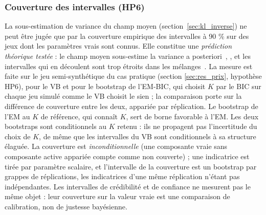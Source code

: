 \subsubsection*{Couverture des intervalles (HP6)}\label{sec:couverture}
La sous-estimation de variance du champ moyen (section~\ref{sec:kl_inverse}) ne peut être jugée que par la couverture empirique des intervalles à 90 \% sur des jeux dont les paramètres vrais sont connus. Elle constitue une \emph{prédiction théorique testée} : le champ moyen sous-estime la variance a posteriori~\cite[section~10.1.2]{bishop2006}, \cite{blei2017}, et les intervalles qui en découlent sont trop étroits dans les mélanges~\cite{wang2005}. La mesure est faite sur le jeu semi-synthétique du cas pratique (section \ref{sec:res_prix}, hypothèse HP6), pour le VB et pour le bootstrap de l'EM-BIC, qui choisit $K$ par le BIC sur chaque jeu simulé comme le VB choisit le sien ; la comparaison porte sur la différence de couverture entre les deux, appariée par réplication. Le bootstrap de l'EM au $K$ de référence, qui connaît $K$, sert de borne favorable à l'EM. Les deux bootstraps sont conditionnels au $K$ retenu : ils ne propagent pas l'incertitude du choix de $K$, de même que les intervalles du VB sont conditionnels à sa structure élaguée. La couverture est \emph{inconditionnelle} (une composante vraie sans composante active appariée compte comme non couverte) ; une indicatrice est tirée par paramètre scalaire, et l'intervalle de la couverture est un bootstrap par grappes de réplications, les indicatrices d'une même réplication n'étant pas indépendantes. Les intervalles de crédibilité et de confiance ne mesurent pas le même objet : leur couverture sur la valeur vraie est une comparaison de calibration, non de justesse bayésienne.

